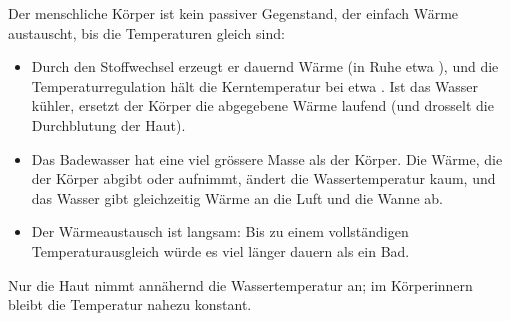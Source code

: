 Der menschliche Körper ist kein passiver Gegenstand, der einfach Wärme austauscht, bis die Temperaturen gleich sind:
\begin{itemize}
\item Durch den Stoffwechsel erzeugt er dauernd Wärme (in Ruhe etwa \PKO), und die Temperaturregulation hält die Kerntemperatur bei etwa \TKO. Ist das Wasser kühler, ersetzt der Körper die abgegebene Wärme laufend (und drosselt die Durchblutung der Haut).
\item Das Badewasser hat eine viel grössere Masse als der Körper. Die Wärme, die der Körper abgibt oder aufnimmt, ändert die Wassertemperatur kaum, und das Wasser gibt gleichzeitig Wärme an die Luft und die Wanne ab.
\item Der Wärmeaustausch ist langsam: Bis zu einem vollständigen Temperaturausgleich würde es viel länger dauern als ein Bad.
\end{itemize}
Nur die Haut nimmt annähernd die Wassertemperatur an; im Körperinnern bleibt die Temperatur nahezu konstant.
